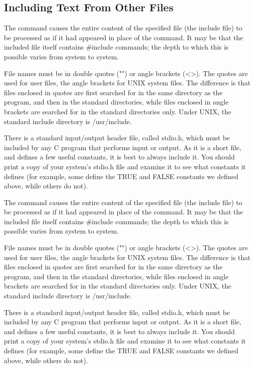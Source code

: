 \subsection{Including Text From Other Files}

The command
causes  the  entire content  of  the specified file  (the {\kc
include file\/}) to be processed as  if it had appeared  in  place of
the command. It may be  that the included file itself contains {\cd
\#include} commands; the depth to which this is possible varies from
system to system.

     File names  must be  in double quotes ({\cd ""}) or angle brackets
({\cd <>}). The quotes are used  for user  files, the  angle brackets 
for  UNIX  system  files.  The difference is that files enclosed in
quotes are first searched for in the same directory as  the program, 
and then  in the standard directories, while files enclosed in angle
brackets are searched for in the standard directories only.  Under
UNIX, the standard include directory is {\cd /usr/include}.

There is  a  standard input/output header file, called {\fn stdio.h},
which must be included  by any  C program that performs input or
output. As it is a short file, and defines a few useful constants, it
is best to always include it. You should print  a copy of your
system's {\fn stdio.h} file and examine it to see what constants it
defines (for example, some define the {\cd TRUE} and {\cd FALSE}
constants we defined above, while others do not).


The command
causes  the  entire content  of  the specified file  (the {\kc
include file\/}) to be processed as  if it had appeared  in  place of
the command. It may be  that the included file itself contains {\cd
\#include} commands; the depth to which this is possible varies from
system to system.

     File names  must be  in double quotes ({\cd ""}) or angle brackets
({\cd <>}). The quotes are used  for user  files, the  angle brackets 
for  UNIX  system  files.  The difference is that files enclosed in
quotes are first searched for in the same directory as  the program, 
and then  in the standard directories, while files enclosed in angle
brackets are searched for in the standard directories only.  Under
UNIX, the standard include directory is {\cd /usr/include}.

There is  a  standard input/output header file, called {\fn stdio.h},
which must be included  by any  C program that performs input or
output. As it is a short file, and defines a few useful constants, it
is best to always include it. You should print  a copy of your
system's {\fn stdio.h} file and examine it to see what constants it
defines (for example, some define the {\cd TRUE} and {\cd FALSE}
constants we defined above, while others do not).

